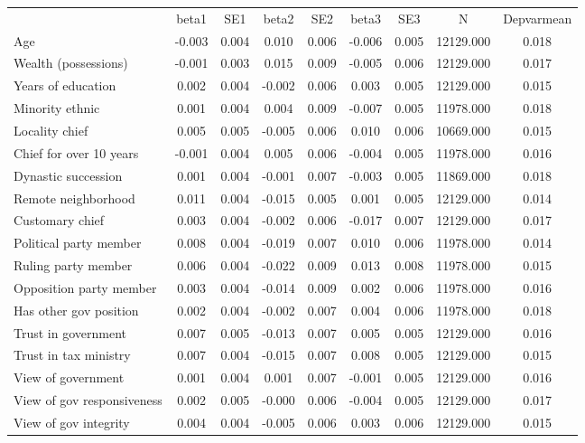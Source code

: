 {\def\sym#1{\ifmmode^{#1}\else\(^{#1}\)\fi} \begin{tabular}{l*{8}{c}} \hline\hline 
& beta1 & SE1 & beta2 & SE2 & beta3 & SE3 & N & Depvarmean \\
Age & -0.003 & 0.004 & 0.010 & 0.006 & -0.006 & 0.005 & 12129.000 & 0.018 \\
Wealth (possessions) & -0.001 & 0.003 & 0.015 & 0.009 & -0.005 & 0.006 & 12129.000 & 0.017 \\
Years of education & 0.002 & 0.004 & -0.002 & 0.006 & 0.003 & 0.005 & 12129.000 & 0.015 \\
Minority ethnic & 0.001 & 0.004 & 0.004 & 0.009 & -0.007 & 0.005 & 11978.000 & 0.018 \\
Locality chief & 0.005 & 0.005 & -0.005 & 0.006 & 0.010 & 0.006 & 10669.000 & 0.015 \\
Chief for over 10 years & -0.001 & 0.004 & 0.005 & 0.006 & -0.004 & 0.005 & 11978.000 & 0.016 \\
Dynastic succession & 0.001 & 0.004 & -0.001 & 0.007 & -0.003 & 0.005 & 11869.000 & 0.018 \\
Remote neighborhood & 0.011 & 0.004 & -0.015 & 0.005 & 0.001 & 0.005 & 12129.000 & 0.014 \\
Customary chief & 0.003 & 0.004 & -0.002 & 0.006 & -0.017 & 0.007 & 12129.000 & 0.017 \\
Political party member & 0.008 & 0.004 & -0.019 & 0.007 & 0.010 & 0.006 & 11978.000 & 0.014 \\
Ruling party member & 0.006 & 0.004 & -0.022 & 0.009 & 0.013 & 0.008 & 11978.000 & 0.015 \\
Opposition party member & 0.003 & 0.004 & -0.014 & 0.009 & 0.002 & 0.006 & 11978.000 & 0.016 \\
Has other gov position & 0.002 & 0.004 & -0.002 & 0.007 & 0.004 & 0.006 & 11978.000 & 0.018 \\
Trust in government & 0.007 & 0.005 & -0.013 & 0.007 & 0.005 & 0.005 & 12129.000 & 0.016 \\
Trust in tax ministry & 0.007 & 0.004 & -0.015 & 0.007 & 0.008 & 0.005 & 12129.000 & 0.015 \\
View of government & 0.001 & 0.004 & 0.001 & 0.007 & -0.001 & 0.005 & 12129.000 & 0.016 \\
View of gov responsiveness & 0.002 & 0.005 & -0.000 & 0.006 & -0.004 & 0.005 & 12129.000 & 0.017 \\
View of gov integrity & 0.004 & 0.004 & -0.005 & 0.006 & 0.003 & 0.006 & 12129.000 & 0.015 \\

\end{tabular}}

